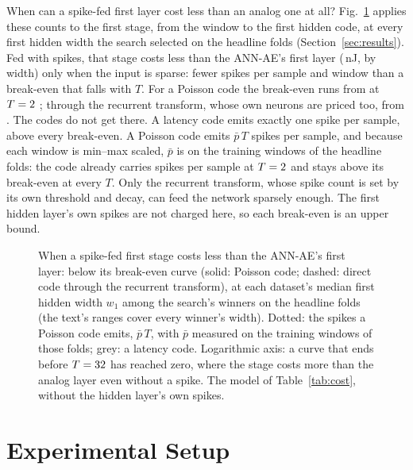 \documentclass[conference]{IEEEtran}
\begin{document}
\par When can a spike-fed first layer cost less than an analog one at all?
Fig.~\ref{fig:breakeven} applies these counts to the first stage, from the window to the first
hidden code, at every first hidden width the search selected on the headline folds
(Section~\ref{sec:results}). Fed with spikes, that stage costs less than the ANN-AE's first
layer (\beRef\,nJ, by width) only when the input is sparse: fewer spikes per sample and window
than a break-even that falls with $T$. For a Poisson code the break-even runs from
\bePoissonHigh{} at $T=2$ \bePoissonLow; through the recurrent transform, whose own neurons
are priced too, from \beRecurrentHigh{} \beRecurrentLow. The codes do not get there. A latency
code emits exactly one spike per sample, above every break-even. A Poisson code emits $\bar p\,T$
spikes per sample, and because each window is min--max scaled, $\bar p$ is \bePbar{} on the
training windows of the headline folds: the code already carries \bePoissonAtTmin{} spikes per sample at $T=2$
and stays above its break-even at every $T$. Only the recurrent transform, whose spike count is
set by its own threshold and decay, can feed the network sparsely enough. The first hidden
layer's own spikes are not charged here, so each break-even is an upper bound.

\begin{figure}[!t]
  \centering
  
  \caption{When a spike-fed first stage costs less than the ANN-AE's first layer: below its
  break-even curve (solid: Poisson code; dashed: direct code through the recurrent transform), at
  each dataset's median first hidden width $w_1$ among the search's winners on the headline folds
  (the text's ranges cover every winner's width). Dotted: the spikes a Poisson code emits,
  $\bar p\,T$, with $\bar p$ measured on the training windows of those folds; grey: a latency
  code. Logarithmic axis: a curve that ends before $T=32$ has reached zero, where the
  stage costs more than the analog layer even without a spike. The model of Table~\ref{tab:cost},
  without the hidden layer's own spikes.}
  \label{fig:breakeven}
\end{figure}

\section{Experimental Setup}
\label{sec:setup}
\end{document}
